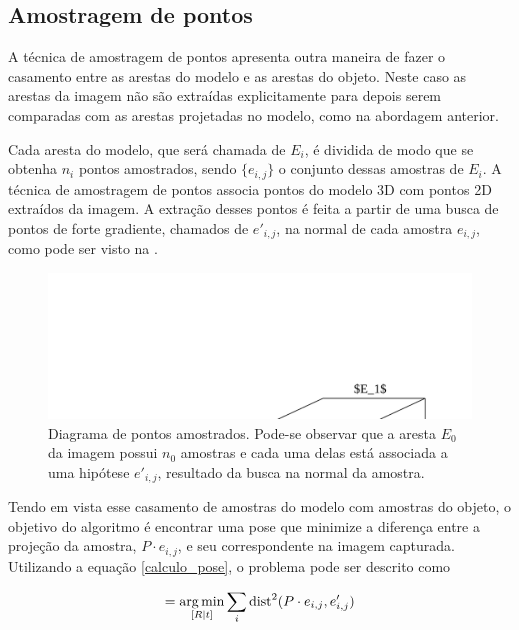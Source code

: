 \subsection{Amostragem de pontos}
\label{sec:amostragem_de_pontos}

A técnica de amostragem de pontos \cite{drummondecipolla} apresenta outra maneira de fazer o casamento entre as arestas do modelo e as arestas do objeto. Neste caso as arestas da imagem não são extraídas explicitamente para depois serem comparadas com as arestas projetadas no modelo, como na abordagem anterior.

Cada aresta do modelo, que será chamada de $E_i$, é dividida de modo que se obtenha $n_i$ pontos amostrados, sendo $\{e_{i,j}\}$ o conjunto dessas amostras de $E_i$. A técnica de amostragem de pontos associa pontos do modelo 3D com pontos 2D extraídos da imagem. A extração desses pontos é feita a partir de uma busca de pontos de forte gradiente, chamados de $e'_{i,j}$, na normal de cada amostra $e_{i,j}$, como pode ser visto na .

\begin{figure}[!ht]
\centering\includegraphics{monografia/sample_point_diagram}
\caption{Diagrama de pontos amostrados. Pode-se observar que a aresta $E_0$ da imagem possui $n_0$ amostras e cada uma delas está associada a uma hipótese $e'_{i,j}$, resultado da busca na normal da amostra.}
\label{amostragem_de_pontos}
\end{figure}

Tendo em vista esse casamento de amostras do modelo com amostras do objeto, o objetivo do algoritmo é encontrar uma pose que minimize a diferença entre a projeção da amostra, $P \cdot e_{i,j}$, e seu correspondente na imagem capturada. Utilizando a equação \eqref{calculo_pose}, o problema pode ser descrito como

\begin{equation}
[R | t] = \argmin_{[R | t]} \sum_i \text{dist}^2(P \cdot e_{i,j}, e'_{i,j})
\label{calculo_pose_amostragem}
\end{equation}

